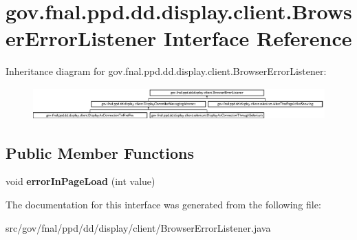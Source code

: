 \hypertarget{interfacegov_1_1fnal_1_1ppd_1_1dd_1_1display_1_1client_1_1BrowserErrorListener}{\section{gov.\-fnal.\-ppd.\-dd.\-display.\-client.\-Browser\-Error\-Listener Interface Reference}
\label{interfacegov_1_1fnal_1_1ppd_1_1dd_1_1display_1_1client_1_1BrowserErrorListener}
}
Inheritance diagram for gov.\-fnal.\-ppd.\-dd.\-display.\-client.\-Browser\-Error\-Listener\-:\begin{figure}[H]
\begin{center}
\leavevmode
\includegraphics[height=1.209503cm]{interfacegov_1_1fnal_1_1ppd_1_1dd_1_1display_1_1client_1_1BrowserErrorListener}
\end{center}
\end{figure}
\subsection*{Public Member Functions}
\begin{DoxyCompactItemize}
\item 
\hypertarget{interfacegov_1_1fnal_1_1ppd_1_1dd_1_1display_1_1client_1_1BrowserErrorListener_a3e9b377582160013a1ff99cfe29765f3}{void {\bfseries error\-In\-Page\-Load} (int value)}\label{interfacegov_1_1fnal_1_1ppd_1_1dd_1_1display_1_1client_1_1BrowserErrorListener_a3e9b377582160013a1ff99cfe29765f3}

\end{DoxyCompactItemize}


The documentation for this interface was generated from the following file\-:\begin{DoxyCompactItemize}
\item 
src/gov/fnal/ppd/dd/display/client/Browser\-Error\-Listener.\-java\end{DoxyCompactItemize}
